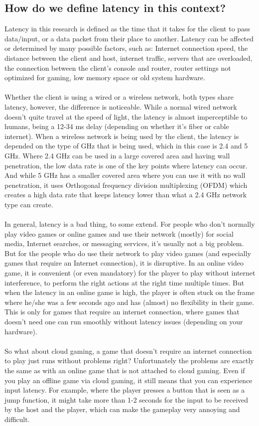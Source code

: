 \subsection{How do we define latency in this context?}
Latency in this research is defined as the time that it takes for the client to pass data/input, or a data packet from their place to another. Latency can be affected or determined by many possible factors, such as: Internet connection speed, the distance between the client and host, internet traffic, servers that are overloaded, the connection between the client's console and router, router settings not optimized for gaming, low memory space or old system hardware.\\\\
Whether the client is using a wired or a wireless network, both types share latency, however, the difference is noticeable. While a normal wired network doesn't quite travel at the speed of light, the latency is almost imperceptible to humans, being a 12-34 ms delay (depending on whether it's fiber or cable internet). When a wireless network is being used by the client, the latency is depended on the type of GHz that is being used, which in this case is 2.4 and 5 GHz. Where 2.4 GHz can be used in a large covered area and having wall penetration, the low data rate is one of the key points where latency can occur. And while 5 GHz has a smaller covered area where you can use it with no wall penetration, it uses Orthogonal frequency division multiplexing (OFDM) which creates a high data rate that keeps latency lower than what a 2.4 GHz network type can create.\\\\
In general, latency is a bad thing, to some extend. For people who don't normally play video games or online games and use their network (mostly) for social media, Internet searches, or messaging services, it's usually not a big problem. But for the people who do use their network to play video games (and especially games that require an Internet connection), it is disruptive. In an online video game, it is convenient (or even mandatory) for the player to play without internet interference, to perform the right actions at the right time multiple times. But when the latency in an online game is high, the player is often stuck on the frame where he/she was a few seconds ago and has (almost) no flexibility in their game. This is only for games that require an internet connection, where games that doesn't need one can run smoothly without latency issues (depending on your hardware).\\\\
So what about cloud gaming, a game that doesn't require an internet connection to play just runs without problems right? Unfortunately the problems are exactly the same as with an online game that is not attached to cloud gaming. Even if you play an offline game via cloud gaming, it still means that you can experience input latency. For example, where the player presses a button that is seen as a jump function, it might take more than 1-2 seconds for the input to be received by the host and the player, which can make the gameplay very annoying and difficult.
